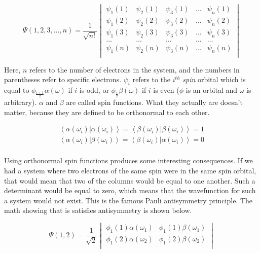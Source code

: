 \begin{equation}
\label{eq:slate_det}
\Psi(1, 2, 3, \ldots, n) =
\frac{1}{\sqrt{n!}}
\begin{vmatrix}
\psi_{1}(1)		&	\psi_{2}(1)		&	\psi_{3}(1)		&	\ldots	&	\psi_{n}(1)		\\
\psi_{1}(2)		&	\psi_{2}(2)		&	\psi_{3}(2)		&	\ldots	&	\psi_{n}(2)		\\
\psi_{1}(3)		&	\psi_{2}(3)		&	\psi_{3}(3)		&	\ldots	&	\psi_{n}(3)		\\
\ldots		&	\ldots		&	\ldots		&	\ldots	&	\ldots		\\
\psi_{1}(n)		&	\psi_{2}(n)		&	\psi_{3}(n)		&	\ldots	&	\psi_{n}(n)		\\

\end{vmatrix}
\end{equation} 

Here, $n$ refers to the number of electrons in the system, and the numbers in parentheses refer to specific electrons. $\psi_{i}$ refers to the $i^{th}$ \textit{spin} orbital which is equal to $\phi_{\frac{i+1}{2}}\alpha(\omega)$ if $i$ is odd, or $\phi_{\frac{i}{2}}\beta(\omega)$ if $i$ is even ($\phi$ is an orbital and $\omega$ is arbitrary). $\alpha$ and $\beta$ are called spin functions. What they actually are doesn't matter, because they are defined to be orthonormal to each other. 

\begin{equation}
\label{eq:a_b_def}
\begin{split}
\left<\alpha(\omega_{i})|\alpha(\omega_{i})\right> = \left<\beta(\omega_{i})|\beta(\omega_{i})\right> = 1	\\
\left<\alpha(\omega_{i})|\beta(\omega_{i})\right> = \left<\beta(\omega_{i})|\alpha(\omega_{i})\right> = 0	\\
\end{split}
\end{equation}

Using orthonormal spin functions produces some interesting consequences. If we had a system where two electrons of the same spin were in the same spin orbital, that would mean that two of the columns would be equal to one another. Such a determinant would be equal to zero, which means that the wavefunction for such a system would not exist. This is the famous Pauli antisymmetry principle\cite{Pauli1925}. The math showing that is satisfies antisymmetry is shown below\cite{Ostlund}.

\begin{equation}
\label{eq:pauli_2t_1}
\Psi(1,2) =
\frac{1}{\sqrt{2}}
\begin{vmatrix}
\phi_{1}(1)\alpha(\omega_{1})		&	\phi_{1}(1)\beta(\omega_{1})		\\
\phi_{1}(2)\alpha(\omega_{2})		&	\phi_{1}(2)\beta(\omega_{2})		\\
\end{vmatrix}
\end{equation}

